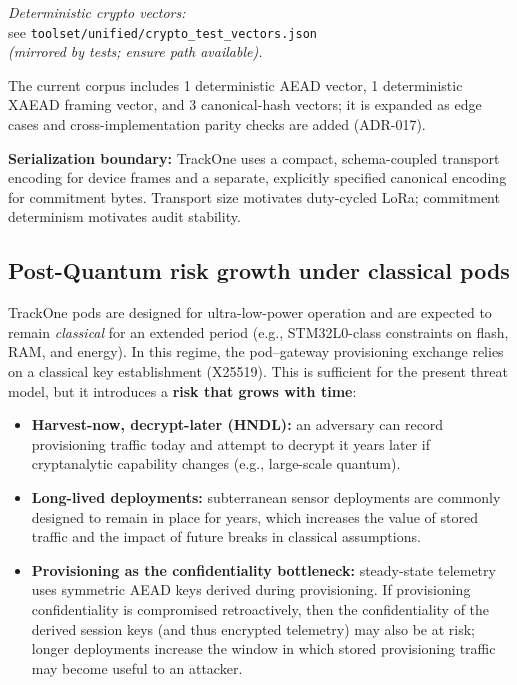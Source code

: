 \textit{Deterministic crypto vectors:}\\ see \texttt{toolset/unified/crypto\_test\_vectors.json} \\ \textit{(mirrored by tests; ensure path available).}

The current corpus includes 1 deterministic \ac{AEAD} vector, 1 deterministic X\ac{AEAD} framing vector, and 3 canonical-hash vectors; it is expanded as edge cases and cross-implementation parity checks are added (\ac{ADR}-017).

\textbf{Serialization boundary:}
TrackOne uses a compact, schema-coupled transport encoding for device frames and a separate,
explicitly specified canonical encoding for commitment bytes.
Transport size motivates duty-cycled \ac{LoRa}; commitment determinism motivates audit stability.

\subsection{Post-Quantum risk growth under classical pods}
\label{subsec:pq-risk-growth}

TrackOne pods are designed for ultra-low-power operation and are expected to remain \emph{classical} for an extended
period (e.g., STM32L0-class constraints on flash, RAM, and energy).
In this regime, the pod--gateway provisioning
exchange relies on a classical key establishment (X25519).
This is sufficient for the present threat model, but it
introduces a \textbf{risk that grows with time}:

\begin{itemize}[nosep]
    \item \textbf{Harvest-now, decrypt-later (HNDL):} an adversary can record provisioning traffic today and attempt to
    decrypt it years later if cryptanalytic capability changes (e.g., large-scale quantum).
    \item \textbf{Long-lived deployments:} subterranean sensor deployments are commonly designed to remain in place for
    years, which increases the value of stored traffic and the impact of future breaks in classical assumptions.
    \item \textbf{Provisioning as the confidentiality bottleneck:} steady-state telemetry uses symmetric \ac{AEAD} keys derived
    during provisioning.
    If provisioning confidentiality is compromised retroactively, then the confidentiality of the
    derived session keys (and thus encrypted telemetry) may also be at risk; longer deployments increase the window in
    which stored provisioning traffic may become useful to an attacker.
\end{itemize}

